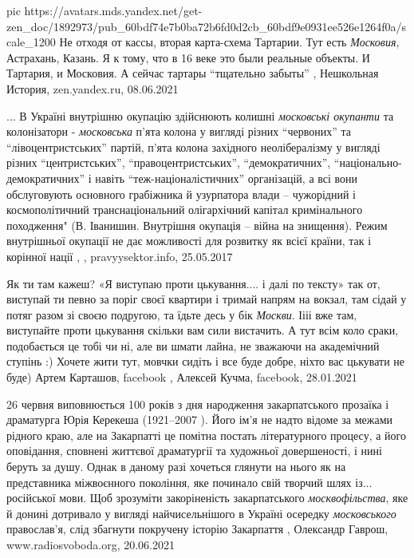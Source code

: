 \ifcmt
  pic https://avatars.mds.yandex.net/get-zen_doc/1892973/pub_60bdf74e7b0ba72b6fd0d2cb_60bdf9e0931ee526e1264f0a/scale_1200
\fi
Не отходя от кассы, вторая карта-схема Тартарии. Тут есть \emph{Московия}, Астрахань,
Казань. Я к тому, что в 16 веке это были реальные объекты. И Тартария, и
Московия.  А сейчас тартары \enquote{тщательно забыты}
, 
Нешкольная История, zen.yandex.ru, 08.06.2021

... В Україні внутрішню окупацію здійснюють колишні \emph{московські окупанти} та
колонізатори - \emph{московська} п'ята колона у вигляді різних \enquote{червоних} та
\enquote{лівоцентристських} партій, п'ята колона західного неолібералізму у вигляді
різних \enquote{центристських}, \enquote{правоцентристських}, \enquote{демократичних},
\enquote{національно-демократичних} і навіть \enquote{теж-націоналістичних} організацій, а всі
вони обслуговують основного грабіжника й узурпатора влади – чужорідний і
космополітичний транснаціональний олігархічний капітал кримінального
походження" (В. Іванишин. Внутрішня окупація – війна на знищення).  Режим
внутрішньої окупації не дає можливості для розвитку як всієї країни, так і
корінної нації
, 
, pravyysektor.info, 25.05.2017

Як ти там кажеш? «Я виступаю проти цькування.... і далі по тексту» так от,
виступай ти певно за поріг своєї квартири і тримай напрям на вокзал, там сідай
у потяг разом зі своєю подругою, та їдьте десь у бік \emph{Москви}. Іііі вже там,
виступайте проти цькування скільки вам сили вистачить. А тут всім коло сраки,
подобається це тобі чи ні, але ви шмати лайна, не зважаючи на академічний
ступінь :) Хочете жити тут, мовчки сидіть і все буде добре, ніхто вас цькувати
не буде)
Артем Карташов, facebook
,
Алексей Кучма, facebook, 28.01.2021

26 червня виповнюється 100 років з дня народження закарпатського прозаїка і
драматурга Юрія Керекеша (1921–2007 ). Його ім’я не надто відоме за межами
рідного краю, але на Закарпатті це помітна постать літературного процесу, а
його оповідання, сповнені життєвої драматургії та художньої довершеності, і
нині беруть за душу. Однак в даному разі хочеться глянути на нього як на
представника міжвоєнного покоління, яке починало свій творчий шлях із...
російської мови. Щоб зрозуміти закоріненість закарпатського
\emph{москвофільства}, яке й донині дотривало у вигляді найчисельнішого в
Україні осередку \emph{московського} православ’я, слід збагнути покручену
історію Закарпаття
, 
Олександр Гаврош, www.radiosvoboda.org, 20.06.2021


